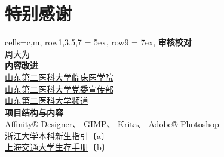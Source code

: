 \chapter*{特别感谢}
\vspace{-2ex}
\begin{table}[H]
    \centering
    \begin{tblr}[
            tall,
            theme = {no-caption},
        note{1} = {符号含义：                                                                     \\〔a〕:已获编委（主编）授权；〔b〕：已询问，暂未答复；〔c〕：未能联系到作者。},
        ]{
            cells={c,m},
            row{1,3,5,7} = {5ex},
            row{9} = {7ex},
        }
        {\large\textbf{审核校对}}                                                                 \\
        {周大为}                                                                                  \\
        {\large\textbf{内容改进}}                                                                 \\
        {
        \uline{\href{https://xchb.sdsmu.edu.cn}{山东第二医科大学临床医学院}}                      \\
        \uline{\href{https://xchb.sdsmu.edu.cn}{山东第二医科大学党委宣传部}}                      \\
        \uline{\href{https://pd.qq.com/s/7mekdr5ve}{山东第二医科大学频道}}
        }                                                                                         \\
        {\large\textbf{项目结构与内容}}                                               \\
        {
        \uline{\href{https://affinity.serif.com/zh-cn/designer}{Affinity® Designer}}、%
        \uline{\href{https://www.gimp.org/}{GIMP}}、%
        \uline{\href{https://krita.org/zh-cn}{Krita}}、%
        \uline{\href{https://www.adobe.com/cn/creativecloud/roc/business.html}{Adobe® Photoshop}} \\
        \uline{\href{https://zjuers.com/welcome}{%
        浙江大学本科新生指引}}〔a〕                                                               \\
        \uline{\href{https://github.com/SurviveSJTU/SurviveSJTUManual}{%
        上海交通大学生存手册}}〔b〕                                                               \\
}
\end{tblr}
\end{table}
